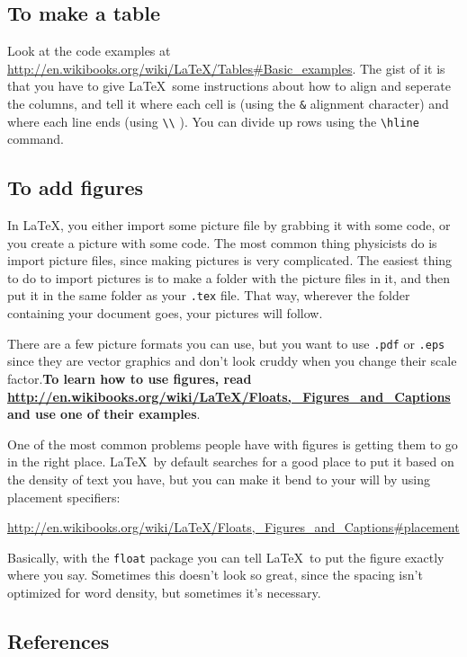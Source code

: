\subsection{To make a table} Look at the code examples at \url{http://en.wikibooks.org/wiki/LaTeX/Tables#Basic_examples}. The gist of it is that you have to give \LaTeX\ some instructions about how to align and seperate the columns, and tell it where each cell is (using the \verb|&| alignment character) and where each line ends (using \verb|\\| ). You can divide up rows using the \verb|\hline| command.
\subsection{To add figures}

In \LaTeX , you either import some picture file by grabbing it with some code, or you create a picture with some code. The most common thing physicists do is import picture files, since making pictures is very complicated. The easiest thing to do to import pictures is to make a folder with the picture files in it, and then put it in the same folder as your \texttt{.tex} file. That way, wherever the folder containing your document goes, your pictures will follow. 

There are a few picture formats you can use, but you want to use \texttt{.pdf} or \texttt{.eps} since they are vector graphics and don't look cruddy when you change their scale factor.{\bf To learn how to use figures, read \url{http://en.wikibooks.org/wiki/LaTeX/Floats,_Figures_and_Captions} and use one of their examples}.

\begin{remark}
One of the most common problems people have with figures is getting them to go in the right place. \LaTeX\ by default searches for a good place to put it based on the density of text you have, but you can make it bend to your will by using placement specifiers:

\url{http://en.wikibooks.org/wiki/LaTeX/Floats,_Figures_and_Captions#placement}

Basically, with the \texttt{float} package you can tell \LaTeX\ to put the figure exactly where you say. Sometimes this doesn't look so great, since the spacing isn't optimized for word density, but sometimes it's necessary. 
\end{remark}

\subsection{References}

